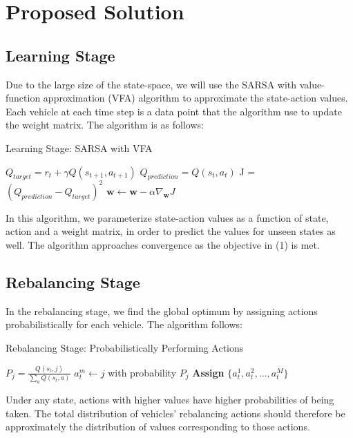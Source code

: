 \documentclass[letterpaper, 10 pt, conference]{ieeeconf}  %
\begin{document}
\section{Proposed Solution}
\subsection{Learning Stage}
Due to the large size of the state-space, we will use the SARSA with value-function approximation (VFA) algorithm to approximate the state-action values. Each vehicle at each time step is a data point that the algorithm use to update the weight matrix. The algorithm is as follows:
\begin{algorithm}[H]
\caption{Learning Stage: SARSA with VFA}
\begin{algorithmic}
    \State $Q_{target} = r_t+\gamma  Q(s_{t+1},a_{t+1})$
    \State  $Q_{prediction} = Q(s_t,a_t)$
    \State J = $(Q_{prediction} - Q_{target})^2$
    \State $\textbf{w} \leftarrow \textbf{w} - \alpha \nabla_{ \textbf{w}} J$
\EndFor
\end{algorithmic}
\end{algorithm}

In this algorithm, we parameterize state-action values as a function of state, action and a weight matrix, in order to predict the values for unseen states as well. The algorithm approaches convergence as the objective in (1) is met.

\subsection{Rebalancing Stage}
In the rebalancing stage, we find the global optimum by assigning actions probabilistically for each vehicle. The algorithm follows: 
\begin{algorithm}[H]
\caption{Rebalancing Stage: Probabilistically Performing Actions}
\begin{algorithmic}
            \State $P_j = \frac{Q(s_t,j)}{\sum_a Q(s_t,a)}$
            \State $a_t^m \leftarrow j$ with probability $P_j$
        \EndIf
    \EndFor
    \State\textbf{Assign} $\{a^1_t,a^2_t,...,a^M_t\}$
\EndFor
\end{algorithmic}
\end{algorithm}
Under any state, actions with higher values have higher probabilities of being taken. The total distribution of vehicles' rebalancing actions should therefore be approximately the distribution of values corresponding to those actions. 
\end{document}
